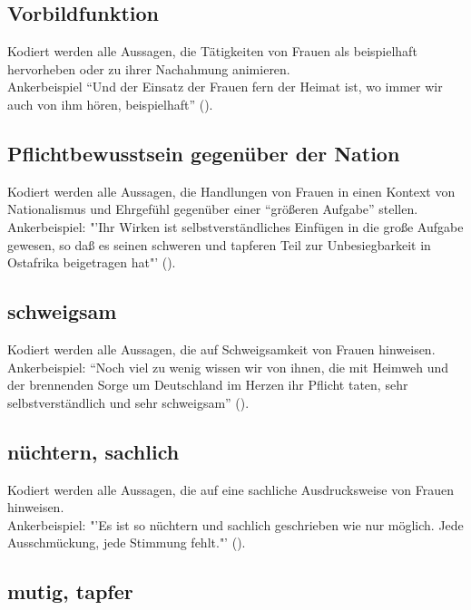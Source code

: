 \documentclass[12pt, titlepage=true, toc=bib]{scrartcl}
\begin{document}
{{}

\newpage

\subsection*{Vorbildfunktion}

Kodiert werden alle Aussagen, die Tätigkeiten von Frauen als beispielhaft hervorheben oder zu ihrer Nachahmung animieren.\\
Ankerbeispiel "`Und der Einsatz der Frauen fern der Heimat ist, wo immer wir auch von ihm hören, beispielhaft"' (\cite[669]{maltzahn_deutsche_1936}).

\subsection*{Pflichtbewusstsein gegenüber der Nation}

Kodiert werden alle Aussagen, die Handlungen von Frauen in einen Kontext von Nationalismus und Ehrgefühl gegenüber einer "`größeren Aufgabe"' stellen.\\
Ankerbeispiel: "'Ihr Wirken ist selbstverständliches Einfügen in die große Aufgabe gewesen, so daß es seinen schweren und tapferen Teil zur Unbesiegbarkeit in Ostafrika beigetragen hat"' (\cite[669]{maltzahn_deutsche_1936}).

\subsection*{schweigsam}

Kodiert werden alle Aussagen, die auf Schweigsamkeit von Frauen hinweisen.\\
Ankerbeispiel: "`Noch viel zu wenig wissen wir von ihnen, die mit Heimweh und der brennenden Sorge um Deutschland im Herzen ihr Pflicht taten, sehr selbstverständlich und sehr schweigsam"' (\cite[669]{maltzahn_deutsche_1936}).

\subsection*{nüchtern, sachlich}

Kodiert werden alle Aussagen, die auf eine sachliche Ausdrucksweise von Frauen hinweisen.\\
Ankerbeispiel: "'Es ist so nüchtern und sachlich geschrieben wie nur möglich. Jede Ausschmückung, jede Stimmung fehlt."' (\cite[669]{maltzahn_deutsche_1936}).

\subsection*{mutig, tapfer}

}
\end{document}
